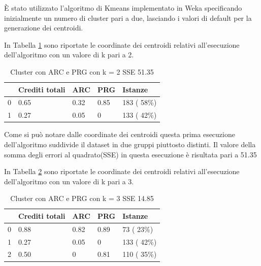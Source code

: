 \documentclass[12pt]{article}
\begin{document}
È stato utilizzato l'algoritmo di Kmeans implementato in Weka specificando inizialmente un numero di cluster pari a due, lasciando i valori di default per la generazione dei centroidi.

In Tabella \ref{c2AP} sono riportate le coordinate dei centroidi relativi all'esecuzione dell'algoritmo con un valore di k pari a 2.


\begin{table}[ht]
	\centering
	\begin{tabular}{@{}lllll@{}}
	\toprule
	  & Crediti totali & ARC  & PRG  & Istanze\\ \midrule
	0 & 0.65           & 0.32 & 0.85 & 183 ( 58\%)\\
	1 & 0.27           & 0.05 & 0    & 133 ( 42\%)\\ \bottomrule
	\end{tabular}
	\caption{Cluster con ARC e PRG con k = 2 SSE 51.35}
	\label{c2AP}
\end{table}

Come si può notare dalle coordinate dei centroidi questa prima esecuzione dell'algoritmo suddivide il dataset in due gruppi piuttosto distinti.
Il valore della somma degli errori al quadrato(SSE) in questa esecuzione è risultata pari a 51.35

In Tabella \ref{c3AP} sono riportate le coordinate dei centroidi relativi all'esecuzione dell'algoritmo con un valore di k pari a 3.
\begin{table}[ht]
	\centering
	\begin{tabular}{@{}lllll@{}}
	\toprule
	  & Crediti totali & ARC  & PRG  & Istanze\\ \midrule
	0 & 0.88           & 0.82 & 0.89 & 73 ( 23\%)\\
	1 & 0.27           & 0.05 & 0    & 133 ( 42\%)\\
	2 & 0.50           & 0    & 0.81 & 110 ( 35\%)\\ \bottomrule
	\end{tabular}
	\caption{Cluster con ARC e PRG con k = 3 SSE 14.85}
	\label{c3AP}
\end{table}
\end{document}
